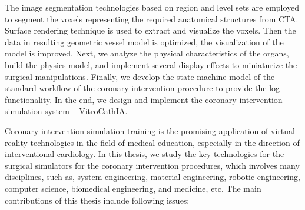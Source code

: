 The image segmentation technologies based on region and level sets are employed
to segment the voxels representing the required anatomical structures from CTA.
Surface rendering technique is used to extract and visualize the voxels. Then
the data in resulting geometric vessel model is optimized, the visualization of
the model is improved. Next, we analyze the physical characteristics of the
organs, build the physics model, and implement several display effects to
miniaturize the surgical manipulations. Finally, we develop the state-machine
model of the standard workflow of the coronary intervention
procedure to provide the log functionality. In the end, we design and implement
the coronary intervention simulation system -- VitroCathIA.

Coronary intervention simulation training is the promising
application of virtual-reality technologies in the field of medical education,
especially in the direction of interventional cardiology. In this thesis, we
study the key technologies for the surgical simulators for the
coronary intervention procedures, which involves many disciplines, such as,
system engineering, material engineering, robotic engineering, computer
science, biomedical engineering, and medicine, etc. The main contributions of
this thesis include following issues:
